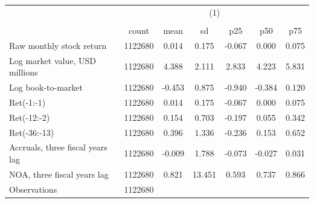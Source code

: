 {
\def\sym#1{\ifmmode^{#1}\else\(^{#1}\)\fi}
\begin{tabular}{l*{1}{cccccc}}
\hline\hline
                    &\multicolumn{6}{c}{(1)}                                                      \\
                    &\multicolumn{6}{c}{}                                                         \\
                    &       count&        mean&          sd&         p25&         p50&         p75\\
\hline
Raw monthly stock return&     1122680&       0.014&       0.175&      -0.067&       0.000&       0.075\\
Log market value, USD millions&     1122680&       4.388&       2.111&       2.833&       4.223&       5.831\\
Log book-to-market  &     1122680&      -0.453&       0.875&      -0.940&      -0.384&       0.120\\
Ret(-1:-1)          &     1122680&       0.014&       0.175&      -0.067&       0.000&       0.075\\
Ret(-12:-2)         &     1122680&       0.154&       0.703&      -0.197&       0.055&       0.342\\
Ret(-36:-13)        &     1122680&       0.396&       1.336&      -0.236&       0.153&       0.652\\
Accruals, three fiscal years lag&     1122680&      -0.009&       1.788&      -0.073&      -0.027&       0.031\\
NOA, three fiscal years lag&     1122680&       0.821&      13.451&       0.593&       0.737&       0.866\\
\hline
Observations        &     1122680&            &            &            &            &            \\
\hline\hline
\end{tabular}
}
